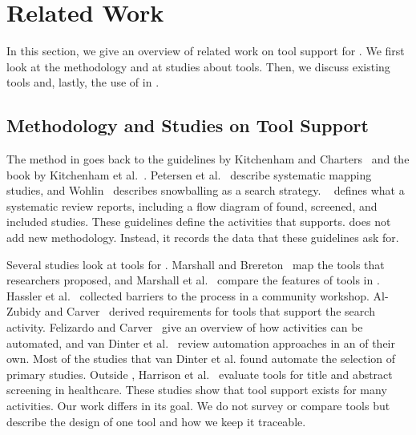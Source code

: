 \section{Related Work}\label{sec:related-work}

In this section, we give an overview of related work on tool support for \SLRs.
We first look at the methodology and at studies about \SLR tools.
Then, we discuss existing tools and, lastly, the use of \LLMs in \SLRs.

\subsection{Methodology and Studies on Tool Support}\label{sec:related-work-studies}

The \SLR method in \SE goes back to the guidelines by Kitchenham and Charters~\cite{kitchenham2007guidelines} and the book by Kitchenham et al.~\cite{kitchenham2015evidence}.
Petersen et al.~\cite{petersen2015guidelines} describe systematic mapping studies, and Wohlin~\cite{wohlin2014guidelines} describes snowballing as a search strategy.
~\cite{page2021prisma} defines what a systematic review reports, including a flow diagram of found, screened, and included studies.
These guidelines define the activities that \SaiLoR supports.
\SaiLoR does not add new methodology.
Instead, it records the data that these guidelines ask for.

Several studies look at tools for \SLRs.
Marshall and Brereton~\cite{marshall2013tools} map the tools that \SE researchers proposed, and Marshall et al.~\cite{marshall2014tools} compare the features of \SLR tools in \SE.
Hassler et al.~\cite{hassler2014outcomes} collected barriers to the \SLR process in a community workshop.
Al-Zubidy and Carver~\cite{alzubidy2019identification} derived requirements for tools that support the search activity.
Felizardo and Carver~\cite{felizardo2020automating} give an overview of how \SLR activities can be automated, and van Dinter et al.~\cite{vandinter2021automation} review automation approaches in an \SLR of their own.
Most of the studies that van Dinter et al. found automate the selection of primary studies.
Outside \SE, Harrison et al.~\cite{harrison2020software} evaluate tools for title and abstract screening in healthcare.
These studies show that tool support exists for many activities.
Our work differs in its goal.
We do not survey or compare tools but describe the design of one tool and how we keep it traceable.

